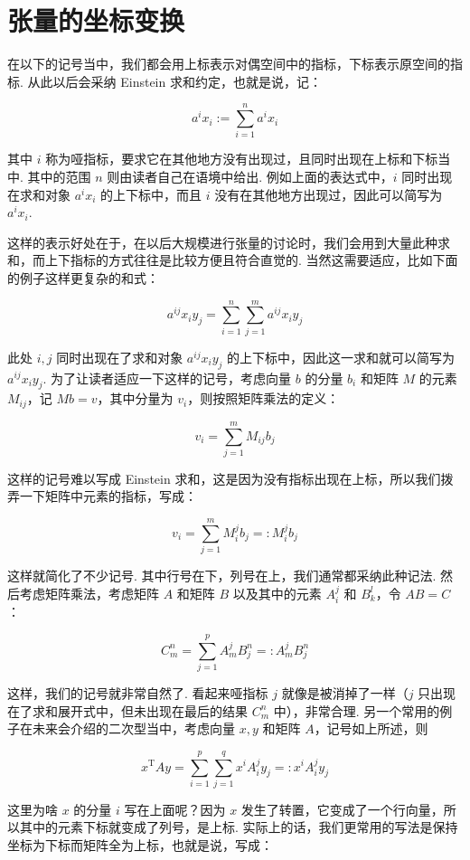 \section{张量的坐标变换}

在以下的记号当中，我们都会用上标表示对偶空间中的指标，下标表示原空间的指标. 从此以后会采纳 Einstein 求和约定，也就是说，记：

\[
a^i x_i := \sum_{i = 1}^n a^i x_i
\]

其中 $i$ 称为哑指标，要求它在其他地方没有出现过，且同时出现在上标和下标当中. 其中的范围 $n$ 则由读者自己在语境中给出. 例如上面的表达式中，$i$ 同时出现在求和对象 $a^i x_i$ 的上下标中，而且 $i$ 没有在其他地方出现过，因此可以简写为 $a^i x_i$.

这样的表示好处在于，在以后大规模进行张量的讨论时，我们会用到大量此种求和，而上下指标的方式往往是比较方便且符合直觉的. 当然这需要适应，比如下面的例子这样更复杂的和式：

\[
a^{ij} x_i y_j = \sum_{i = 1}^n \sum_{j = 1}^m a^{ij} x_i y_j
\]

此处 $i,j$ 同时出现在了求和对象 $a^{ij} x_i y_j$ 的上下标中，因此这一求和就可以简写为 $a^{ij} x_i y_j$. 为了让读者适应一下这样的记号，考虑向量 $b$ 的分量 $b_i$ 和矩阵 $M$ 的元素 $M_{ij}$，记 $Mb = v$，其中分量为 $v_i$，则按照矩阵乘法的定义：

\[
v_i = \sum_{j = 1}^m M_{ij} b_j
\]

这样的记号难以写成 Einstein 求和，这是因为没有指标出现在上标，所以我们拨弄一下矩阵中元素的指标，写成：

\[
v_i = \sum_{j = 1}^m M^j_i b_j =: M^j_i b_j
\]

这样就简化了不少记号. 其中行号在下，列号在上，我们通常都采纳此种记法. 然后考虑矩阵乘法，考虑矩阵 $A$ 和矩阵 $B$ 以及其中的元素 $A_i^j$ 和 $B_k^l$，令 $AB = C$：

\[
C_m^n = \sum\limits_{j=1}^p A_m^j B_j^n =: A_m^j B_j^n
\]

这样，我们的记号就非常自然了. 看起来哑指标 $j$ 就像是被消掉了一样（$j$ 只出现在了求和展开式中，但未出现在最后的结果 $C_m^n$ 中），非常合理. 另一个常用的例子在未来会介绍的二次型当中，考虑向量 $x, y$ 和矩阵 $A$，记号如上所述，则

\[
x^\mathrm{T} A y = \sum\limits_{i=1}^p \sum\limits_{j=1}^q x^i A_i^j y_j =: x^i A_i^j y_j
\]

这里为啥 $x$ 的分量 $i$ 写在上面呢？因为 $x$ 发生了转置，它变成了一个行向量，所以其中的元素下标就变成了列号，是上标. 实际上的话，我们更常用的写法是保持坐标为下标而矩阵全为上标，也就是说，写成：

